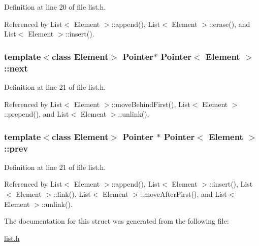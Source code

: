 Definition at line 20 of file list.h.

Referenced by List$<$ Element $>$::append(), List$<$ Element $>$::erase(), and List$<$ Element $>$::insert().\hypertarget{structPointer_fc15ebf0f8711484a573fe2e3553c46a}{
\subsubsection[{next}]{\setlength{\rightskip}{0pt plus 5cm}template$<$class Element$>$ {\bf Pointer}$\ast$ {\bf Pointer}$<$ Element $>$::{\bf next}}}
\label{structPointer_fc15ebf0f8711484a573fe2e3553c46a}




Definition at line 21 of file list.h.

Referenced by List$<$ Element $>$::moveBehindFirst(), List$<$ Element $>$::prepend(), and List$<$ Element $>$::unlink().\hypertarget{structPointer_1864db6eb6132cfa6ef211b065753c55}{
\subsubsection[{prev}]{\setlength{\rightskip}{0pt plus 5cm}template$<$class Element$>$ {\bf Pointer} $\ast$ {\bf Pointer}$<$ Element $>$::{\bf prev}}}
\label{structPointer_1864db6eb6132cfa6ef211b065753c55}




Definition at line 21 of file list.h.

Referenced by List$<$ Element $>$::append(), List$<$ Element $>$::insert(), List$<$ Element $>$::link(), List$<$ Element $>$::moveAfterFirst(), and List$<$ Element $>$::unlink().

The documentation for this struct was generated from the following file:\begin{CompactItemize}
\item 
\hyperlink{list_8h}{list.h}\end{CompactItemize}

